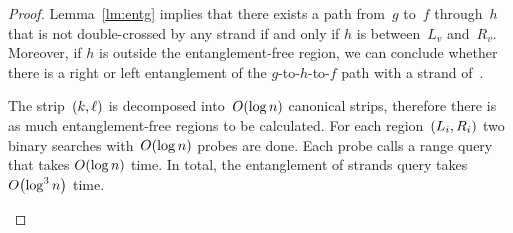 \documentclass[a4paper,11pt]{article}
\begin{document}
\begin{proof}
	Lemma~\ref{lm:entg} implies that there exists a path from~\(g\) to~\(f\)
	through~\(h\) that is not double-crossed by any strand if and only if \(h\)
	is between~\(L_v\) and~\(R_v\). Moreover, if \(h\) is outside the
	entanglement-free region, we can conclude whether there is a right or left
	entanglement of the \(g\)-to-\(h\)-to-\(f\) path with a strand of~\braid.
	
\begin{remark}
	The strip~\(\lr*{k, \ell}\) is decomposed into~\(O\lr*{\log n}\)
	canonical strips, therefore there is as much entanglement-free regions
	to be calculated. For each region~\(\lr*{L_i, R_i}\) two binary searches
	with~\(O\lr*{\log n}\) probes are done. Each probe calls a range query
	that takes \(O\lr*{\log n}\) time. In total, the entanglement of strands
	query takes \(O\lr*{\log^3 n}\) time.
\end{remark}
\end{proof}

%
\end{document}
